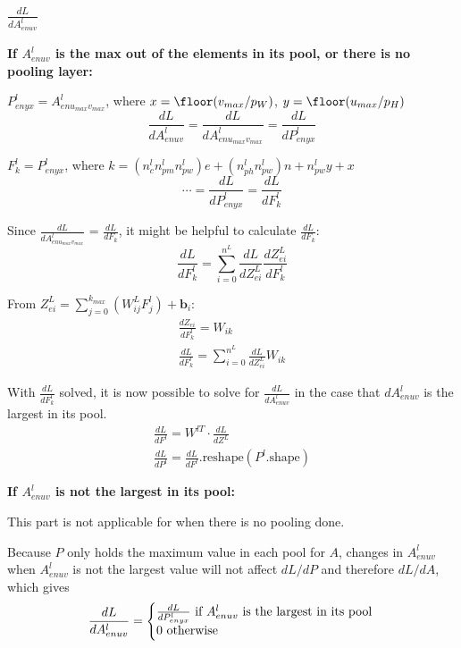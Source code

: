 \documentclass[12pt]{article}
\begin{document}
\subsubsection{$\frac{dL}{dA^l_{enuv}}$}

\textbf{If $A^l_{enuv}$ is the max out of the elements in its pool, or there is no pooling layer:}

$P^l_{enyx} = A^l_{enu_{max}v_{max}}$, where $x = \floor(v_{max}/p_{W})$, $y = \floor(u_{max}/p_H)$
\[ \frac{dL}{dA^l_{enuv}} = \frac{dL}{dA^l_{enu_{max}v_{max}}} = \frac{dL}{dP^l_{enyx}} \]

$F^l_k = P^l_{enyx}$, where $k = (n_c^l n_{pm}^l n_{pw}^l)e + (n_{ph}^l n_{pw}^l) n + n_{pw}^l y + x$
\[ \cdots = \frac{dL}{dP^l_{enyx}} = \frac{dL}{dF^l_k} \]

Since $\frac{dL}{dA^l_{enu_{max}v_{max}}}$ = $\frac{dL}{dF_k}$, it might be helpful to calculate
$\frac{dL}{dF_k}$:
\[ \frac{dL}{dF^l_k} = \sum_{i=0}^{n^L} \frac{dL}{dZ^L_{ei}} \frac{dZ^L_{ei}}{dF^l_k} \]

From $Z^L_{ei} = \sum_{j=0}^{k_{max}} (W^L_{ij} F^l_j) + \bm b_i$:
\begin{gather*}
    \frac{dZ_{ei}}{dF^l_k} = W_{ik}\\
    \frac{dL}{dF^l_k} = \sum_{i=0}^{n^L} \frac{dL}{dZ^L_{ei}} W_{ik}
\end{gather*}

With $\frac{dL}{dF^l_k}$ solved, it is now possible to solve for $\frac{dL}{dA^l_{enuv}}$ in
the case that $dA^l_{enuv}$ is the largest in its pool.
\begin{gather*}
    \frac{dL}{dF^l} = W^{l T} \cdot \frac{dL}{dZ^L}\\
    \frac{dL}{dP^l} = \frac{dL}{dF^l}\text{.reshape}(P^l\text{.shape})
\end{gather*}

\textbf{If $A^l_{enuv}$ is not the largest in its pool:}

This part is not applicable for when there is no pooling done.

Because $P$ only holds the maximum value in each pool for $A$, changes in $A^l_{enuv}$ when $A^l_{enuv}$
is not the largest value will not affect $dL/dP$ and therefore $dL/dA$, which gives
\[
    \frac{dL}{dA^l_{enuv}} =
    \left\{\begin{array}{@{}l@{}}
            \frac{dL}{dP^l_{enyx}} \text{ if $A^l_{enuv}$ is the largest in its pool}\\
            0 \text{ otherwise}
    \end{array}\right.\,
\]
\end{document}
